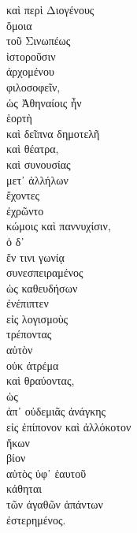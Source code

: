 {\large
\begin{greek}
\noindent καὶ περὶ Διογένους \\
ὅμοια \\
\tabto{2em} τοῦ Σινωπέως \\
ἱστοροῦσιν \\

\tabto{2em} ἀρχομένου \\
\tabto{4em} φιλοσοφεῖν, \\
ὡς Ἀθηναίοις ἦν\\
\tabto{2em} ἑορτὴ \\
\tabto{2em} καὶ δεῖπνα δημοτελῆ \\
\tabto{2em} καὶ θέατρα, \\
καὶ συνουσίας \\
\tabto{2em} μετ᾽ ἀλλήλων \\
ἔχοντες \\
ἐχρῶντο \\
\tabto{2em} κώμοις καὶ παννυχίσιν, \\
ὁ δ᾽ \\
\tabto{2em} ἔν τινι γωνίᾳ \\
συνεσπειραμένος \\
\tabto{2em} ὡς καθευδήσων \\
ἐνέπιπτεν \\
\tabto{2em} εἰς λογισμοὺς\\
\tabto{4em} τρέποντας \\
\tabto{6em} αὐτὸν \\
\tabto{6em} οὐκ ἀτρέμα \\
\tabto{4em} καὶ θραύοντας, \\
\tabto{6em} ὡς \\
\tabto{8em} ἀπ᾽ οὐδεμιᾶς ἀνάγκης \\
\tabto{8em} εἰς ἐπίπονον καὶ ἀλλόκοτον\\
\tabto{6em} ἥκων\\
\tabto{8em} βίον \\
\tabto{6em} αὐτὸς ὑφ᾽ ἑαυτοῦ \\
\tabto{6em} κάθηται \\
\tabto{8em} τῶν ἀγαθῶν ἁπάντων \\
\tabto{6em} ἐστερημένος.\\

\end{greek}
}

